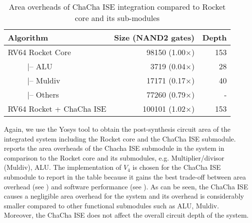 \begin{table}
	\caption{Area overheads of ChaCha ISE integration compared to Rocket core and its sub-modules}
	\label{tab:res:hardcost2}
	\begin{tabular}{lrr}
		\toprule            
		Algorithm        &     Size (NAND2 gates)       & Depth \\
		
		\midrule
		RV64 Rocket Core               &    98150 (1.00$\times$)  &  153  \\
		~~~~~|-- ALU                   &     3719 (0.04$\times$)  &   28  \\
		~~~~~|-- Muldiv                &    17171 (0.17$\times$)  &   40  \\
		~~~~~|-- Others                &    77260 (0.79$\times$)  &    -  \\
		RV64 Rocket + ChaCha ISE &   100101 (1.02$\times$)  &  153  \\ 
		
		\bottomrule
	\end{tabular} 
\end{table}

Again, we use the Yosys tool to obtain the post-synthesis circuit area of the integrated system including the Rocket core and the ChaCha ISE submodule.  reports the area overheads of the Chacha ISE submodule in the system in comparison to the Rocket core and its submodules, e.g. Multiplier/divisor (Muldiv), ALU. The implementation of $V_4$ is chosen for the ChaCha ISE submodule to report in the table because it gains the best trade-off between area overhead (see ) and software performance (see ). As can be seen, the ChaCha ISE causes a negligible area overhead for the system and its overhead is considerably smaller compared to other functional submodules such as ALU, Muldiv. Moreover, the ChaCha ISE does not affect the overall circuit depth of the system.



